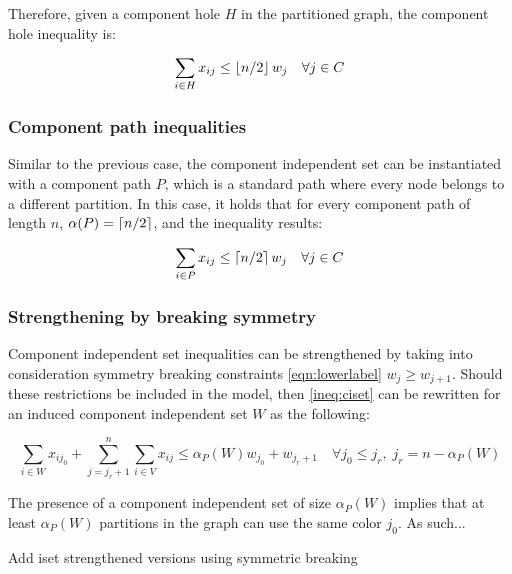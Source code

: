 Therefore, given a component hole $H$ in the partitioned graph, the component hole inequality is:

\begin{equation}
\label{ineq:chole}
\sum _{i \in H} x_{ij} \leq \left\lfloor n / 2 \right\rfloor w_{j} \quad \forall j \in C
\end{equation}


\subsubsection*{Component path inequalities}

Similar to the previous case, the component independent set can be instantiated with a component path $P$, which is a standard path where every node belongs to a different partition. In this case, it holds that for every component path of length $n$, $\alpha(P) = \left\lceil n / 2 \right\rceil$, and the inequality results:

\begin{equation}
\label{ineq:cpath}
\sum _{i \in P} x_{ij} \leq \left\lceil n / 2 \right\rceil w_{j} \quad \forall j \in C
\end{equation}

\subsubsection*{Strengthening by breaking symmetry}

Component independent set inequalities can be strengthened by taking into consideration symmetry breaking constraints \ref{eqn:lowerlabel} $w_j \geq w_{j+1}$. Should these restrictions be included in the model, then \ref{ineq:ciset} can be rewritten for an induced component independent set $W$ as the following:

\begin{equation}
\label{ineq:cisetbs}
\sum_{i \in W} x_{ij_0} + \sum ^n _{j = j_r + 1} \sum _{i \in V} x_{ij} \leq \alpha_P(W) w_{j_0} + w_{j_r + 1} \quad \forall j_0 \leq j_r, \; j_r = n - \alpha_P(W)
\end{equation}

The presence of a component independent set of size $\alpha_P(W)$ implies that at least $\alpha_P(W)$ partitions in the graph can use the same color $j_0$. As such...

\TODO Add iset strengthened versions using symmetric breaking

